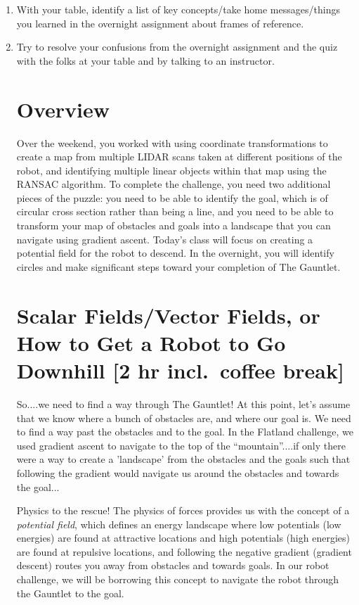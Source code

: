 \documentclass{tufte-handout}
\begin{document}
\begin{enumerate}[series=exercises, label=\textbf{Exercise} (\arabic*)]
\item With your table, identify a list of key concepts/take home messages/things you learned in the overnight assignment about frames of reference.
\item Try to resolve your confusions from the overnight assignment and the quiz with the folks at your table and by talking to an instructor.
\ee

\clearpage

\section{Overview}

Over the weekend, you worked with using coordinate transformations to create a map from multiple LIDAR scans taken at different positions of the robot, and identifying multiple linear objects within that map using the RANSAC algorithm.  To complete the challenge, you need two additional pieces of the puzzle:  you need to be able to identify the goal, which is of circular cross section rather than being a line, and you need to be able to transform your map of obstacles and goals into a landscape that you can navigate using gradient ascent.  Today's class will focus on creating a potential field for the robot to descend. In the overnight, you will identify circles and make significant steps toward your completion of The Gauntlet.




\section{Scalar Fields/Vector Fields, or How to Get a Robot to Go Downhill [2 hr incl.\ coffee break]}
So....we need to find a way through The Gauntlet!  At this point, let's assume that we know where a bunch of obstacles are, and where our goal is.  We need to find a way past the obstacles and to the goal.  In the Flatland challenge, we used gradient ascent to navigate to the top of the ``mountain''....if only there were a way to create a 'landscape' from the obstacles and the goals such that following the gradient would navigate us around the obstacles and towards the goal...

Physics to the rescue!  The physics of forces provides us with the concept of a {\it potential field}, which defines an energy landscape where low potentials (low energies) are found at attractive locations and high potentials (high energies) are found at repulsive locations, and following the negative gradient (gradient descent) routes you away from obstacles and towards goals.  In our robot challenge, we will be borrowing this concept to navigate the robot through the Gauntlet to the goal.


\end{enumerate}
\end{document}
